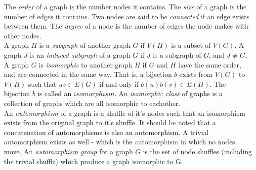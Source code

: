 The \textit{order} of a graph is the number nodes it contains. The \textit{size} of a graph is the number of edges it contains. Two nodes are said to be \textit{connected} if an edge exists between them. The \textit{degree} of a node is the number of edges the node makes with other nodes.\\
A graph $H$ is a \textit{subgraph} of another graph $G$ if $V(H)$ is a subset of $V(G)$. A graph $J$ is an \textit{induced subgraph} of a graph $G$ if $J$ is a subgraph of $G$, and $J\neq G$.
A graph $G$ is \textit{isomorphic} to another graph $H$ if $G$ and $H$ have the same order, and are connected in the same way. That is, a bijection $b$ exists from $V(G)$ to $V(H)$ such that $uv\in E(G)$ if and only if $b(u)b(v)\in E(H)$. The bijection $b$ is called an $isomorphism$. An \textit{isomorphic class} of graphs is a collection of graphs which are all isomorphic to eachother.\\
An \textit{automorphism} of a graph is a shuffle of it's nodes such that an isomorphism exists from the original graph to it's shuffle. It should be noted that a concatenation of automorphisms is also an automorphism. A trivial automorphism exists as well - which is the automorphism in which no nodes move. An \textit{automorphism group} for a graph $G$ is the set of node shuffles (including the trivial shuffle) which produce a graph isomorphic to G.\\